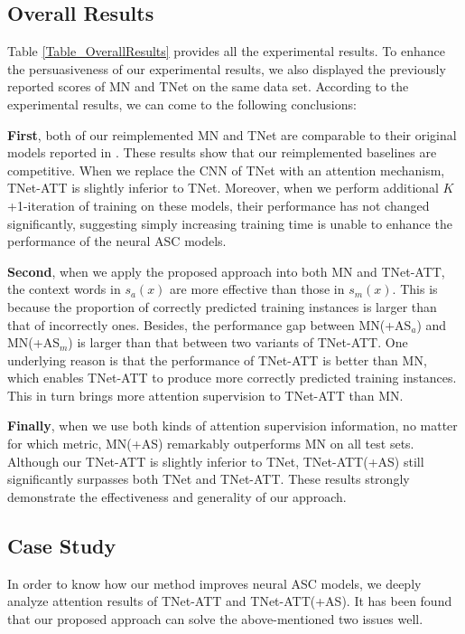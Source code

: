 \documentclass[11pt,a4paper]{article}
\begin{document}
\subsection{Overall Results}
Table \ref{Table_OverallResults} provides all the experimental results.
To enhance the persuasiveness of our experimental results,
we also displayed the previously reported scores of MN \cite{Wang:ACL2018} and TNet \cite{Li:ACL2018} on the same data set.
According to the experimental results,
we can come to the following conclusions:

\textbf{First},
both of our reimplemented MN and TNet are comparable to their original models reported in \cite{Wang:ACL2018,Li:ACL2018}.
These results show that our reimplemented baselines are competitive.
When we replace the CNN of TNet with an attention mechanism,
TNet-ATT is slightly inferior to TNet.
Moreover,
when we perform additional $K$+1-iteration of training on these models,
their performance has not changed significantly,
suggesting simply increasing training time is unable to enhance the performance of the neural ASC models.

\textbf{Second},
when we apply the proposed approach into both MN and TNet-ATT,
the context words in $s_a(x)$ are more effective than those in $s_m(x)$.
This is because the proportion of correctly predicted training instances is larger than that of incorrectly ones.
Besides,
the performance gap between MN(+AS$_a$) and MN(+AS$_m$) is larger than that between two variants of TNet-ATT.
One underlying reason is that the performance of TNet-ATT is better than MN,
which enables TNet-ATT to produce more correctly predicted training instances.
This in turn brings more attention supervision to TNet-ATT than MN.

\textbf{Finally},
when we use both kinds of attention supervision information,
no matter for which metric,
MN(+AS) remarkably outperforms MN on all test sets.
Although our TNet-ATT is slightly inferior to TNet,
TNet-ATT(+AS) still significantly surpasses both TNet and TNet-ATT.
These results strongly demonstrate the effectiveness and generality of our approach.


\subsection{Case Study}

In order to know how our method improves neural ASC models,
we deeply analyze attention results of TNet-ATT and TNet-ATT(+AS).
It has been found that our proposed approach can solve the above-mentioned two issues well.
\end{document}
